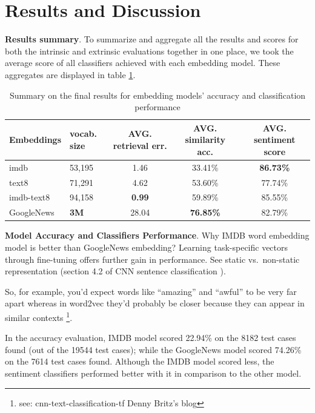 \documentclass[11pt,letterpaper]{article}
\begin{document}
\section{Results and Discussion}\label{results-and-discussion}

\textbf{Results summary}. To summarize and aggregate all the results and scores for both the intrinsic and extrinsic evaluations together in one place,
we took the average score of all classifiers achieved with each
embedding model. These aggregates are displayed in table \ref{tbl:summary}.

\begin{table}[ht]
\centering
\footnotesize

\begin{tabular}{@{}l||l||ccc@{}}
\toprule

Embeddings & vocab. size & AVG. retrieval err. & AVG. similarity
acc. & AVG. sentiment score \\\midrule

imdb & 53,195 & 1.46 & 33.41\% & \textbf{86.73\%} \\
text8 & 71,291 & 4.62 & 53.60\% & 77.74\% \\
imdb-text8 & 94,158 & \textbf{0.99} & 59.89\% & 85.55\% \\
GoogleNews & \textbf{3M} & 28.04 & \textbf{76.85\%} & 82.79\% \\

\bottomrule
\end{tabular}

\caption{Summary on the final results for embedding models' accuracy and
classification performance \label{tbl:summary}}

\end{table}

\textbf{Model Accuracy and Classifiers Performance}. Why IMDB word
embedding model is better than GoogleNews embedding? Learning
task-specific vectors through fine-tuning offers further gain in
performance. See static vs.~non-static representation (section 4.2 of
CNN sentence classification \citep{kim2014convolutional}).

So, for example, you'd expect words like ``amazing'' and ``awful'' to be
very far apart whereas in word2vec they'd probably be closer because
they can appear in similar contexts
\footnote{see: cnn-text-classification-tf Denny Britz's blog}.

In the accuracy evaluation, IMDB model scored 22.94\% on the 8182 test
cases found (out of the 19544 test cases); while the GoogleNews model
scored 74.26\% on the 7614 test cases found. Although the IMDB model
scored less, the sentiment classifiers performed better with it in
comparison to the other model.
\end{document}

